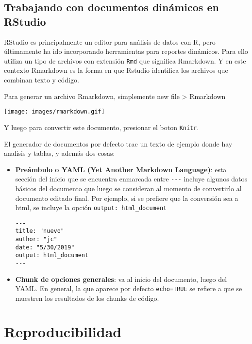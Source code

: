 \documentclass[
  11pt,
]{book}
\begin{document}
\hypertarget{trabajando-con-documentos-dinuxe1micos-en-rstudio}{%
\subsection{Trabajando con documentos dinámicos en RStudio}\label{trabajando-con-documentos-dinuxe1micos-en-rstudio}}

RStudio es principalmente un editor para análisis de datos con R, pero últimamente ha ido incorporando herramientas para reportes dinámicos. Para ello utiliza un tipo de archivos con extensión \texttt{Rmd} que significa Rmarkdown. Y en este contexto Rmarkdown es la forma en que Rstudio identifica los archivos que combinan texto y código.

Para generar un archivo Rmarkdown, simplemente new file \textgreater{} Rmarkdown

\texttt{[image: images/rmarkdown.gif]}

Y luego para convertir este documento, presionar el boton \texttt{Knitr}.

El generador de documentos por defecto trae un texto de ejemplo donde hay analisis y tablas, y además dos cosas:

\begin{itemize}
\item
  \textbf{Preámbulo o YAML (Yet Another Markdown Language)}: esta sección del inicio que se encuentra enmarcada entre \texttt{-\/-\/-} incluye algunos datos básicos del documento que luego se consideran al momento de convertirlo al documento editado final. Por ejemplo, si se prefiere que la conversión sea a html, se incluye la opción \texttt{output:\ html\_document}

\begin{verbatim}
---
title: "nuevo"
author: "jc"
date: "5/30/2019"
output: html_document
---
\end{verbatim}
\item
  \textbf{Chunk de opciones generales}: va al inicio del documento, luego del YAML. En general, la que aparece por defecto \texttt{echo=TRUE} se refiere a que se muestren los resultados de los chunks de código.
\end{itemize}

\hypertarget{reproducibilidad}{%
\section{Reproducibilidad}\label{reproducibilidad}}

  
\end{document}
